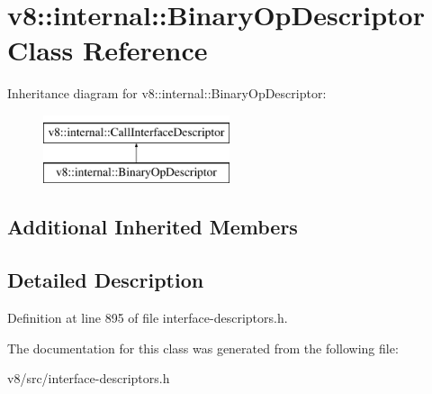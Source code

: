 \hypertarget{classv8_1_1internal_1_1BinaryOpDescriptor}{}\section{v8\+:\+:internal\+:\+:Binary\+Op\+Descriptor Class Reference}
\label{classv8_1_1internal_1_1BinaryOpDescriptor}
Inheritance diagram for v8\+:\+:internal\+:\+:Binary\+Op\+Descriptor\+:\begin{figure}[H]
\begin{center}
\leavevmode
\includegraphics[height=2.000000cm]{classv8_1_1internal_1_1BinaryOpDescriptor}
\end{center}
\end{figure}
\subsection*{Additional Inherited Members}


\subsection{Detailed Description}


Definition at line 895 of file interface-\/descriptors.\+h.



The documentation for this class was generated from the following file\+:\begin{DoxyCompactItemize}
\item 
v8/src/interface-\/descriptors.\+h\end{DoxyCompactItemize}
